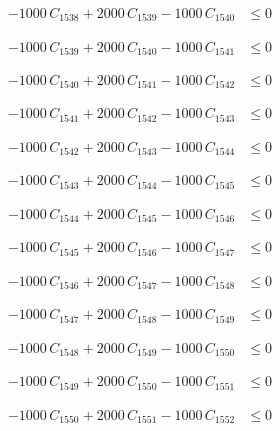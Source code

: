 \documentclass[a4paper,11pt]{article}
\begin{document}
\begin{align}
-1000\,C_{1538} + 2000\,C_{1539} - 1000\,C_{1540} &\leq 0 \nonumber
\end{align}

\begin{align}
-1000\,C_{1539} + 2000\,C_{1540} - 1000\,C_{1541} &\leq 0 \nonumber
\end{align}

\begin{align}
-1000\,C_{1540} + 2000\,C_{1541} - 1000\,C_{1542} &\leq 0 \nonumber
\end{align}

\begin{align}
-1000\,C_{1541} + 2000\,C_{1542} - 1000\,C_{1543} &\leq 0 \nonumber
\end{align}

\begin{align}
-1000\,C_{1542} + 2000\,C_{1543} - 1000\,C_{1544} &\leq 0 \nonumber
\end{align}

\begin{align}
-1000\,C_{1543} + 2000\,C_{1544} - 1000\,C_{1545} &\leq 0 \nonumber
\end{align}

\begin{align}
-1000\,C_{1544} + 2000\,C_{1545} - 1000\,C_{1546} &\leq 0 \nonumber
\end{align}

\begin{align}
-1000\,C_{1545} + 2000\,C_{1546} - 1000\,C_{1547} &\leq 0 \nonumber
\end{align}

\begin{align}
-1000\,C_{1546} + 2000\,C_{1547} - 1000\,C_{1548} &\leq 0 \nonumber
\end{align}

\begin{align}
-1000\,C_{1547} + 2000\,C_{1548} - 1000\,C_{1549} &\leq 0 \nonumber
\end{align}

\begin{align}
-1000\,C_{1548} + 2000\,C_{1549} - 1000\,C_{1550} &\leq 0 \nonumber
\end{align}

\begin{align}
-1000\,C_{1549} + 2000\,C_{1550} - 1000\,C_{1551} &\leq 0 \nonumber
\end{align}

\begin{align}
-1000\,C_{1550} + 2000\,C_{1551} - 1000\,C_{1552} &\leq 0 \nonumber
\end{align}
\end{document}
